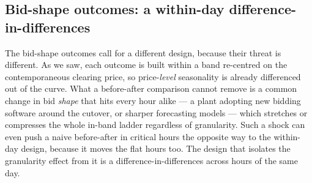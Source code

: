 \documentclass[11pt,a4paper]{article}
\theoremstyle{definition}
\theoremstyle{remark}
\theoremstyle{plain}
\begin{document}
\subsection{Bid-shape outcomes: a within-day difference-in-differences}\label{sec:empirical:bidshape}\label{sec:empirical:specC}

The bid-shape outcomes call for a different design, because their threat is different. As we saw, each outcome is built within a band re-centred on the contemporaneous clearing price, so price-\emph{level} seasonality is already differenced out of the curve. What a before-after comparison cannot remove is a common change in bid \emph{shape} that hits every hour alike --- a plant adopting new bidding software around the cutover, or sharper forecasting models --- which stretches or compresses the whole in-band ladder regardless of granularity. Such a shock can even push a naive before-after in critical hours the opposite way to the within-day design, because it moves the flat hours too. The design that isolates the granularity effect from it is a difference-in-differences across hours of the same day.
\end{document}
